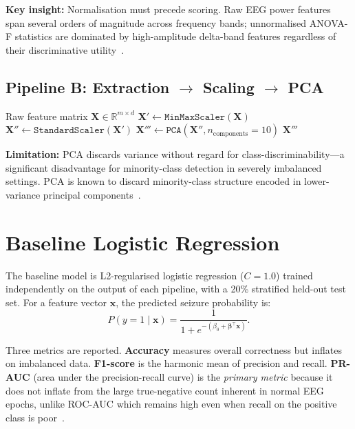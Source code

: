 \documentclass[conference]{IEEEtran}
\begin{document}
\noindent\textbf{Key insight:} Normalisation must precede scoring. Raw EEG
power features span several orders of magnitude across frequency bands; unnormalised
ANOVA-F statistics are dominated by high-amplitude delta-band features
regardless of their discriminative utility~\cite{Hastie2009}.

\subsection{Pipeline B: Extraction $\to$ Scaling $\to$ PCA}

\begin{algorithm}[h]
\caption{Pipeline B}
\label{alg:pipeB}
\begin{algorithmic}[1]
  \Require Raw feature matrix $\mathbf{X} \in \mathbb{R}^{m \times d}$
  \State $\mathbf{X}' \gets \texttt{MinMaxScaler}(\mathbf{X})$
  \State $\mathbf{X}'' \gets \texttt{StandardScaler}(\mathbf{X}')$
  \State $\mathbf{X}''' \gets \texttt{PCA}(\mathbf{X}'', n_\text{components}{=}10)$
  \State \Return $\mathbf{X}'''$
\end{algorithmic}
\end{algorithm}

\noindent\textbf{Limitation:} PCA discards variance without regard for
class-discriminability---a significant disadvantage for minority-class
detection in severely imbalanced settings. PCA is known to discard
minority-class structure encoded in lower-variance principal
components~\cite{Hastie2009}.

\section{Baseline Logistic Regression}
\label{sec:baseline}

The baseline model is L2-regularised logistic regression ($C{=}1.0$) trained
independently on the output of each pipeline, with a 20\% stratified
held-out test set. For a feature vector $\mathbf{x}$, the predicted seizure
probability is:
\begin{equation}
  P(y{=}1 \mid \mathbf{x}) = \frac{1}{1 + e^{-(\beta_0 + \boldsymbol{\beta}^\top\mathbf{x})}}.
  \label{eq:logreg}
\end{equation}

Three metrics are reported. \textbf{Accuracy} measures overall correctness
but inflates on imbalanced data. \textbf{F1-score} is the harmonic mean of
precision and recall. \textbf{PR-AUC} (area under the precision-recall
curve) is the \emph{primary metric} because it does not inflate from the
large true-negative count inherent in normal EEG epochs, unlike ROC-AUC
which remains high even when recall on the positive class is poor~\cite{Davis2006}.
\end{document}
